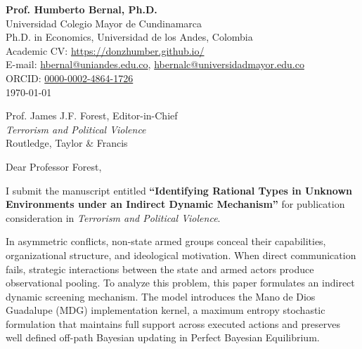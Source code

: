 \documentclass[11pt]{article}
\begin{document}
\singlespacing

\begin{flushright}
\textbf{Prof. Humberto Bernal, Ph.D.} \\
Universidad Colegio Mayor de Cundinamarca \\
Ph.D. in Economics, Universidad de los Andes, Colombia \\
Academic CV: \url{https://donzhumber.github.io/} \\
E-mail: \href{mailto:hbernal@uniandes.edu.co}{hbernal@uniandes.edu.co}, \href{mailto:hbernalc@universidadmayor.edu.co}{hbernalc@universidadmayor.edu.co} \\
ORCID: \href{https://orcid.org/0000-0002-4864-1726}{0000-0002-4864-1726} \\
\today
\end{flushright}

\vspace{0.8em}

\begin{flushleft}
Prof. James J.F. Forest, Editor-in-Chief \\
\textit{Terrorism and Political Violence} \\
Routledge, Taylor \& Francis
\end{flushleft}

\vspace{0.8em}

\noindent Dear Professor Forest,

\vspace{0.5em}

\noindent I submit the manuscript entitled \textbf{``Identifying Rational Types in Unknown Environments under an Indirect Dynamic Mechanism''} for publication consideration in \textit{Terrorism and Political Violence}.

\vspace{0.5em}

\noindent In asymmetric conflicts, non-state armed groups conceal their capabilities, organizational structure, and ideological motivation. When direct communication fails, strategic interactions between the state and armed actors produce observational pooling. To analyze this problem, this paper formulates an indirect dynamic screening mechanism. The model introduces the Mano de Dios Guadalupe (MDG) implementation kernel, a maximum entropy stochastic formulation that maintains full support across executed actions and preserves well defined off-path Bayesian updating in Perfect Bayesian Equilibrium.
\end{document}
